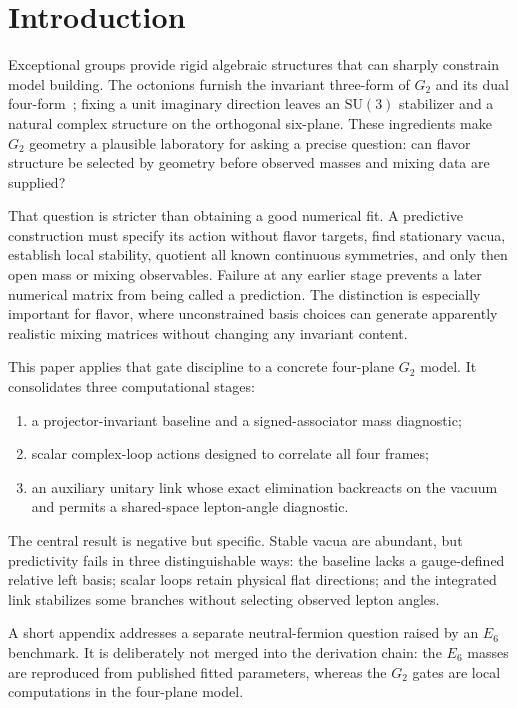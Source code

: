\documentclass[11pt]{article}
\newcommand{\SU}{\mathrm{SU}}
\begin{document}
\section{Introduction}

Exceptional groups provide rigid algebraic structures that can sharply constrain model building.  The octonions furnish the invariant three-form of $G_2$ and its dual four-form~\cite{Baez2002,Bryant1987}; fixing a unit imaginary direction leaves an $\SU(3)$ stabilizer and a natural complex structure on the orthogonal six-plane.  These ingredients make $G_2$ geometry a plausible laboratory for asking a precise question: can flavor structure be selected by geometry before observed masses and mixing data are supplied?

That question is stricter than obtaining a good numerical fit.  A predictive construction must specify its action without flavor targets, find stationary vacua, establish local stability, quotient all known continuous symmetries, and only then open mass or mixing observables.  Failure at any earlier stage prevents a later numerical matrix from being called a prediction.  The distinction is especially important for flavor, where unconstrained basis choices can generate apparently realistic mixing matrices without changing any invariant content.

This paper applies that gate discipline to a concrete four-plane $G_2$ model.  It consolidates three computational stages:
\begin{enumerate}[leftmargin=2.1em]
  \item a projector-invariant baseline and a signed-associator mass diagnostic;
  \item scalar complex-loop actions designed to correlate all four frames;
  \item an auxiliary unitary link whose exact elimination backreacts on the vacuum and permits a shared-space lepton-angle diagnostic.
\end{enumerate}
The central result is negative but specific.  Stable vacua are abundant, but predictivity fails in three distinguishable ways: the baseline lacks a gauge-defined relative left basis; scalar loops retain physical flat directions; and the integrated link stabilizes some branches without selecting observed lepton angles.

A short appendix addresses a separate neutral-fermion question raised by an $E_6$ benchmark.  It is deliberately not merged into the derivation chain: the $E_6$ masses are reproduced from published fitted parameters, whereas the $G_2$ gates are local computations in the four-plane model.
\end{document}

